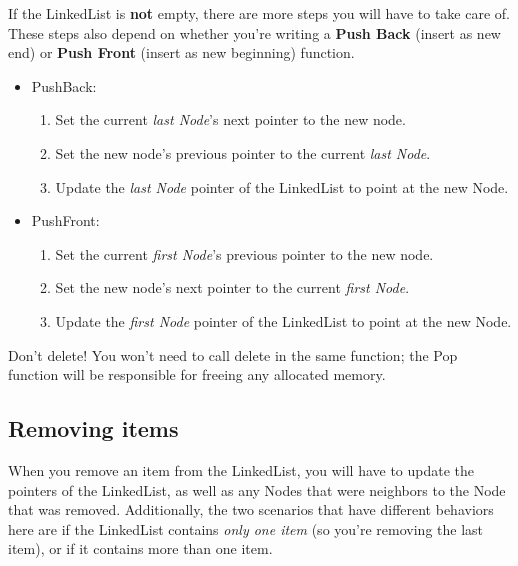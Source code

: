 \documentclass[a4paper,12pt,oneside]{book}
\begin{document}
            If the LinkedList is \textbf{not} empty, there are more steps
            you will have to take care of. These steps also depend on whether
            you're writing a \textbf{Push Back} (insert as new end) 
            or \textbf{Push Front} (insert as new beginning) function.
            
            \begin{itemize}
                \item PushBack:
                \begin{enumerate}
                    \item Set the current \textit{last Node}'s next pointer to the new node.
                    \item Set the new node's previous pointer to the current \textit{last Node}.
                    \item Update the \textit{last Node} pointer of the LinkedList to point at the new Node.
                \end{enumerate}
                
                \item PushFront:
                \begin{enumerate}
                    \item Set the current \textit{first Node}'s previous pointer to the new node.
                    \item Set the new node's next pointer to the current \textit{first Node}.
                    \item Update the \textit{first Node} pointer of the LinkedList to point at the new Node.
                \end{enumerate}
            \end{itemize}
    
    
        \begin{error}{Don't delete!}
        You won't need to call delete in the same function; the Pop function will be responsible for freeing any allocated memory.    
        \end{error}
        
        
    \subsection{Removing items}
    
        When you remove an item from the LinkedList, you will have to update
        the pointers of the LinkedList, as well as any Nodes that were neighbors
        to the Node that was removed. Additionally, the two scenarios that
        have different behaviors here are if the LinkedList contains 
        \textit{only one item} (so you're removing the last item), or
        if it contains more than one item.
        
\end{document}
